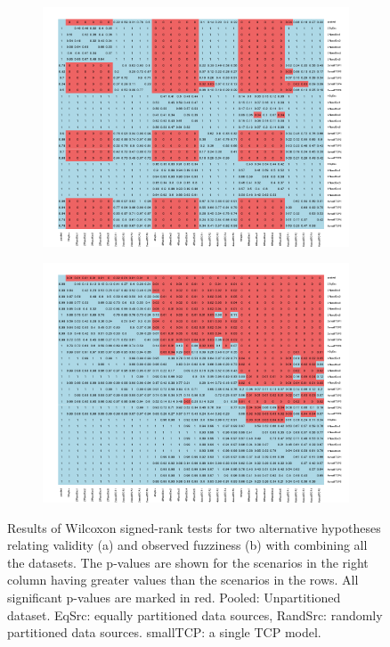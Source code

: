 \documentclass[main]{subfiles}
\begin{document}
\begin{figure}[H]
\centering
\begin{subfigure}{\textwidth}
  \centering
  \includegraphics[width=.75\linewidth]{images/heatmapCombined}
\end{subfigure}%

\begin{subfigure}{\textwidth}
  \centering
  \includegraphics[width=.75\linewidth]{images/heatmapCombined_eff}
\end{subfigure}%
\caption{Results of Wilcoxon signed-rank tests for two alternative hypotheses relating validity (a) and observed fuzziness (b) with combining all the datasets. The p-values are shown for the scenarios in the right column having greater values than the scenarios in the rows. All significant p-values are marked in red. Pooled: Unpartitioned dataset. EqSrc: equally partitioned data sources, RandSrc: randomly partitioned data sources. smallTCP: a single TCP model.} \label{fig:testCombined}
\end{figure}
\end{document}

